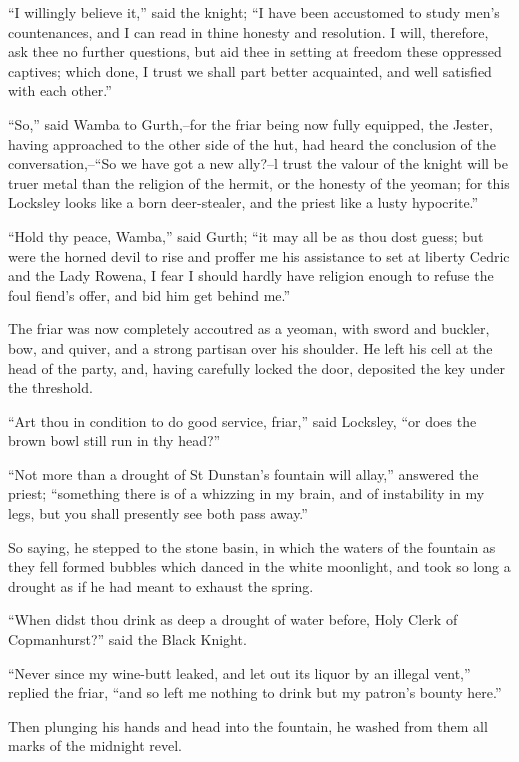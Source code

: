 ``I willingly believe it,'' said the knight; ``I have been accustomed to
study men's countenances, and I can read in thine honesty and
resolution. I will, therefore, ask thee no further questions, but aid
thee in setting at freedom these oppressed captives; which done, I trust
we shall part better acquainted, and well satisfied with each other.''

``So,'' said Wamba to Gurth,--for the friar being now fully equipped,
the Jester, having approached to the other side of the hut, had heard
the conclusion of the conversation,--``So we have got a new ally?--l
trust the valour of the knight will be truer metal than the religion of
the hermit, or the honesty of the yeoman; for this Locksley looks like a
born deer-stealer, and the priest like a lusty hypocrite.''

``Hold thy peace, Wamba,'' said Gurth; ``it may all be as thou dost
guess; but were the horned devil to rise and proffer me his assistance
to set at liberty Cedric and the Lady Rowena, I fear I should hardly
have religion enough to refuse the foul fiend's offer, and bid him get
behind me.''

The friar was now completely accoutred as a yeoman, with sword and
buckler, bow, and quiver, and a strong partisan over his shoulder. He
left his cell at the head of the party, and, having carefully locked the
door, deposited the key under the threshold.

``Art thou in condition to do good service, friar,'' said Locksley, ``or
does the brown bowl still run in thy head?''

``Not more than a drought of St Dunstan's fountain will allay,''
answered the priest; ``something there is of a whizzing in my brain, and
of instability in my legs, but you shall presently see both pass away.''

So saying, he stepped to the stone basin, in which the waters of the
fountain as they fell formed bubbles which danced in the white
moonlight, and took so long a drought as if he had meant to exhaust the
spring.

``When didst thou drink as deep a drought of water before, Holy Clerk of
Copmanhurst?'' said the Black Knight.

``Never since my wine-butt leaked, and let out its liquor by an illegal
vent,'' replied the friar, ``and so left me nothing to drink but my
patron's bounty here.''

Then plunging his hands and head into the fountain, he washed from them
all marks of the midnight revel.


